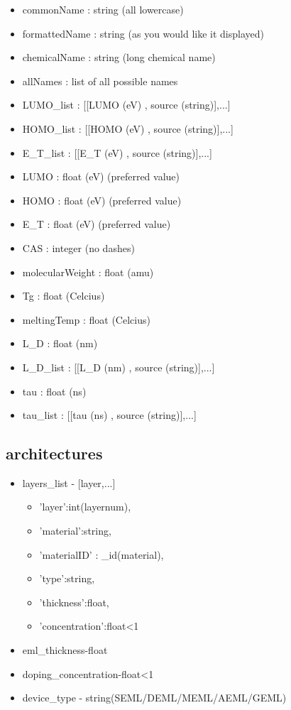 \documentclass[../thesis.tex]{subfiles}
\begin{document}
\begin{itemize}
\item commonName : string (all lowercase)
\item formattedName : string (as you would like it displayed)
\item chemicalName : string (long chemical name)
\item allNames : list of all possible names
\item LUMO\_list : [[LUMO (eV) , source (string)],...]
\item HOMO\_list : [[HOMO (eV) , source (string)],...]
\item E\_T\_list : [[E\_T (eV) , source (string)],...]
\item LUMO : float (eV) (preferred value)
\item HOMO : float (eV) (preferred value)
\item E\_T : float (eV) (preferred value)
\item CAS : integer (no dashes)
\item molecularWeight : float (amu)
\item Tg : float (Celcius)
\item meltingTemp : float (Celcius)
\item L\_D : float (nm)
\item L\_D\_list : [[L\_D (nm) , source (string)],...]
\item tau : float (ns)
\item tau\_list : [[tau (ns) , source (string)],...]
\end{itemize}


\subsection{architectures}
\begin{itemize}
\item layers\_list - [layer,...]
\begin{itemize}

\item 'layer':int(layernum),
\item 'material':string,
\item 'materialID' : \_id(material),
\item 'type':string,
\item 'thickness':float,
\item 'concentration':float<1
\end{itemize}
\item eml\_thickness-float
\item doping\_concentration-float<1
\item device\_type - string(SEML/DEML/MEML/AEML/GEML)
\end{itemize}
\end{document}
